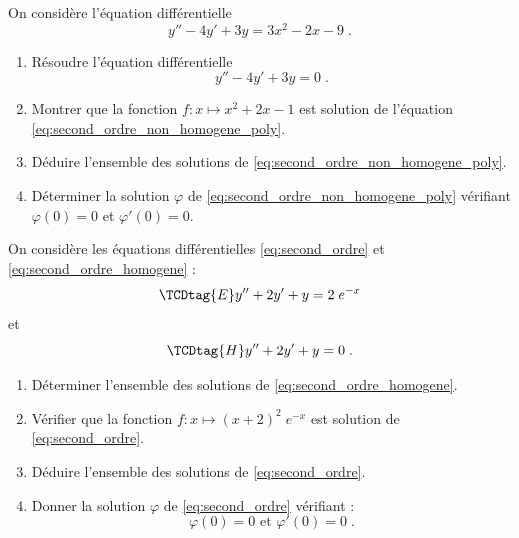 \begin{exo}
\label{exo:ed polynome}
On consid\`ere l'\'equation diff\'erentielle
      \begin{equation}
      y'' - 4 y' + 3y = 3 x^2 - 2 x - 9 \; .
      \label{eq:second_ordre_non_homogene_poly}
      \end{equation}
\begin{enumerate}
\item R\'esoudre l'\'equation diff\'erentielle
      \[
      y'' - 4 y' + 3y = 0 \; .
      \]
\item Montrer que la fonction $f : x \mapsto x^2 + 2 x - 1$
      est solution de l'\'equation \eqref{eq:second_ordre_non_homogene_poly}.
\item D\'eduire l'ensemble des solutions de \eqref{eq:second_ordre_non_homogene_poly}.
\item D\'eterminer la solution $\varphi$ de \eqref{eq:second_ordre_non_homogene_poly} v\'erifiant $\varphi (0) = 0$
      et $\varphi'(0) = 0$.
\end{enumerate}
\end{exo}

\begin{exo}
\label{exo:ed double}
On consid\`ere les \'equations diff\'erentielles \eqref{eq:second_ordre} et \eqref{eq:second_ordre_homogene} :
      \begin{equation}
      \TCDtag{E}
      y'' + 2 y' + y = 2 \; e^{-x}
      \label{eq:second_ordre}
      \end{equation}
      et
      \begin{equation}
      \TCDtag{H}
      y'' + 2 y' + y = 0  \; .
      \label{eq:second_ordre_homogene}
      \end{equation}
\begin{enumerate}
\item D\'eterminer l'ensemble des solutions de \eqref{eq:second_ordre_homogene}.
\item V\'erifier que la fonction $f : x \mapsto (x+2)^2 \; e^{-x} $ est solution de \eqref{eq:second_ordre}.
\item D\'eduire l'ensemble des solutions de \eqref{eq:second_ordre}.
\item Donner la solution $\varphi$ de \eqref{eq:second_ordre} v\'erifiant :
      \[
      \varphi (0) = 0 \text{ et } \varphi' (0) = 0 \; .
      \]
\end{enumerate}
\end{exo}

